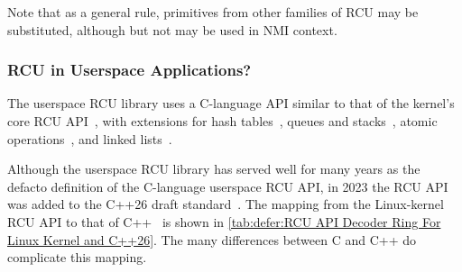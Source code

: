 Note that as a general rule, primitives from other families of RCU
may be substituted, although  but not
 may be used in NMI context.

\subsubsection{RCU in Userspace Applications?}
\label{sec:defer:RCU in Userspace Applications?}

The userspace RCU library uses a C-language API similar to that of
the kernel's core RCU API~\cite{PaulMcKenney2013LWNURCUAPI},
with extensions for
hash tables~\cite{PaulMcKenney2013LWNURCUhashAPI},
queues and stacks~\cite{PaulMcKenney2013LWNURCUqueuestackAPI},
atomic operations~\cite{PaulMcKenney2013LWNURCUatomicop}, and
linked lists~\cite{PaulMcKenney2013LWNURCUlist}.

\begin{table}
\renewcommand*{\arraystretch}{1.15}
\footnotesize
\centering\OneColumnHSpace{-.4in}
\caption{RCU API Decoder Ring For Linux Kernel and C++26}
\label{tab:defer:RCU API Decoder Ring For Linux Kernel and C++26}
\end{table}

Although the userspace RCU library has served well for many years as the
defacto definition of the C-language userspace RCU API, in 2023 the RCU
API was added to the C++26 draft
standard~\cite{PaulEMcKennney2023C++26RCU4,ThomasKoeppe2025N5032}.
The mapping from the Linux-kernel RCU API to that of
C++~\cite{PaulEMcKenney2023P0124R8-LKMM,PaulEMcKenney2026cppRCU}
is shown in
\cref{tab:defer:RCU API Decoder Ring For Linux Kernel and C++26}.
The many differences between C and C++ do complicate this mapping.

